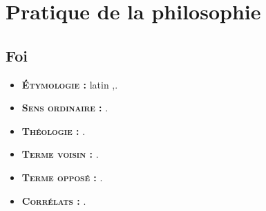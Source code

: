 
\section{Pratique de la philosophie}

\subsection{Foi}


\begin{itemize}[leftmargin=1cm, label=, itemsep=1pt]
\item {\bf \textsc{Étymologie} :} latin {\it },.
\item {\bf \textsc{Sens ordinaire} :} .
\item {\bf \textsc{Théologie} :} .
\end{itemize}

\begin{itemize}[leftmargin=1cm, label=, itemsep=1pt]
\item {\bf \textsc{Terme voisin} :} .
\item {\bf \textsc{Terme opposé} :} .
\item {\bf \textsc{Corrélats} :} .
\end{itemize}

\vspace{0.5cm}
{\bf }
